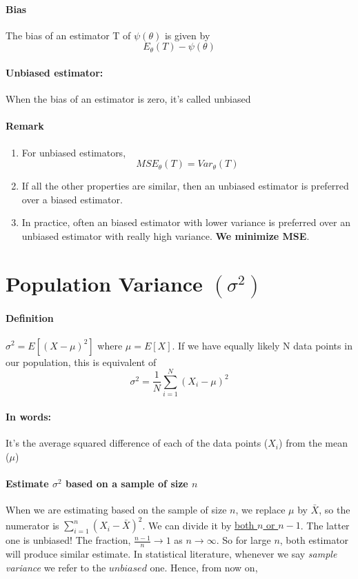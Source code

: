 \documentclass[11pt]{article}
\newcommand{\ti}[1]{\textit{#1}}
\newcommand{\tb}[1]{\textbf{#1}}
\newcommand{\under}[1]{\underline{#1}}
\begin{document}
\paragraph{Bias} The bias of an estimator T of $\psi(\theta)$ is given by $$E_\theta(T) - \psi(\theta)$$
\paragraph{Unbiased estimator:} When the bias of an estimator is zero, it's called unbiased
\paragraph{Remark}
\begin{enumerate}
	\item For unbiased estimators, $$MSE_\theta(T) = Var_\theta(T)$$
	\item If all the other properties are similar, then an unbiased estimator is preferred over a biased estimator.
	\item In practice, often an biased estimator with lower variance is preferred over an unbiased estimator with really high variance. \tb{We minimize MSE}.
\end{enumerate}
\section{Population Variance $(\sigma^2)$}
\paragraph{Definition} $\sigma^2 = E[(X - \mu)^2]$ where $\mu = E[X]$. \newline
If we have equally likely N data points in our population, this is equivalent of $$\sigma^2 = \frac{1}{N}\sum_{i = 1}^N(X_i - \mu)^2$$
\paragraph{In words:} It's the average squared difference of each of the data points ($X_i$) from the mean ($\mu$)
\paragraph{Estimate $\sigma^2$ based on a sample of size $n$}
When we are estimating based on the sample of size $n$, we replace $\mu$ by $\bar X$, so the numerator is $\sum_{i=1}^n(X_i-\bar X)^2$. We can divide it by \under{both $n$ or $n-1$}. The latter one is unbiased! \newline
The fraction, $\frac{n-1}{n} \rightarrow 1$ as $n \rightarrow \infty$. So for large $n$, both estimator will produce similar estimate. In statistical literature, whenever we say \ti{sample variance} we refer to the $unbiased$ one. Hence, from now on,
\end{document}
